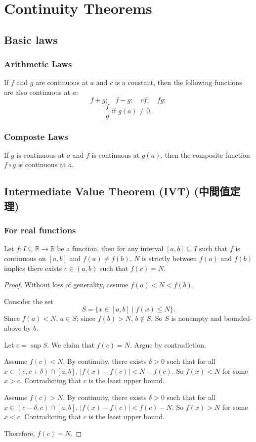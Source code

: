 \section{Continuity Theorems}
\subsection{Basic laws}
\subsubsection{Arithmetic Laws}
If $f$ and $g$ are continuous at $a$ and $c$ is a constant, then the following functions are also continuous at $a$:
\[f+g;\quad f-g;\quad cf;\quad fg;\]
\[\frac{f}{g}\text{\ if\ }g(a)\neq 0.\]
\subsubsection{Composte Laws}
If $g$ is continuous at $a$ and $f$ is continuous at $g(a)$, then the composite function $f\circ g$ is continuous at $a$.
\subsection{Intermediate Value Theorem (IVT) (中間值定理)}
\subsubsection{For real functions}
Let $f\colon I\subseteq\mathbb{R}\to\mathbb{R}$ be a function, then for any interval $[a,b]\subseteq I$ such that $f$ is continuous on $[a,b]$ and $f(a)\neq f(b)$, $N$ is strictly between $f(a)$ and $f(b)$ implies there exists $c\in (a,b)$ such that $f(c)=N$.
\begin{proof}
Without loss of generality, assume $f(a)<N<f(b)$.

Consider the set
\[S=\{x\in [a,b]\mid f(x)\leq N\}.\]
Since $f(a)<N$, $a\in S$; since $f(b)>N$, $b\notin S$. So $S$ is nonempty and bounded-above by $b$.

Let $c=\sup S$. We claim that $f(c)=N$. Argue by contradiction.

Assume $f(c)<N$. By continuity, there exists $\delta>0$ such that for all $x\in (c,c+\delta)\cap [a,b]$, $|f(x)-f(c)|<N-f(c)$. So $f(x)<N$ for some $x>c$. Contradicting that $c$ is the least upper bound.

Assume $f(c)>N$. By continuity, there exists $\delta>0$ such that for all $x\in (c-\delta,c)\cap [a,b]$, $|f(x)-f(c)|<f(c)-N$. So $f(x)>N$ for some $x<c$. Contradicting that $c$ is the least upper bound.

Therefore, $f(c)=N$.
\end{proof}
